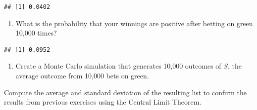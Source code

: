 \documentclass[
]{article}
\newenvironment{Shaded}{\begin{snugshade}}{\end{snugshade}}
\newcommand{\CommentTok}[1]{\textcolor[rgb]{0.56,0.35,0.01}{\textit{#1}}}
\newcommand{\DecValTok}[1]{\textcolor[rgb]{0.00,0.00,0.81}{#1}}
\newcommand{\KeywordTok}[1]{\textcolor[rgb]{0.13,0.29,0.53}{\textbf{#1}}}
\newcommand{\NormalTok}[1]{#1}
\newcommand{\OperatorTok}[1]{\textcolor[rgb]{0.81,0.36,0.00}{\textbf{#1}}}
\newcommand{\StringTok}[1]{\textcolor[rgb]{0.31,0.60,0.02}{#1}}
\providecommand{\tightlist}{%
  \setlength{\itemsep}{0pt}\setlength{\parskip}{0pt}}
\begin{document}
\begin{verbatim}
## [1] 0.0402
\end{verbatim}

\begin{enumerate}
\def\labelenumi{\arabic{enumi}.}
\setcounter{enumi}{7}
\tightlist
\item
  What is the probability that your winnings are positive after betting
  on green 10,000 times?
\end{enumerate}

\begin{Shaded}
\end{Shaded}

\begin{verbatim}
## [1] 0.0952
\end{verbatim}

\begin{enumerate}
\def\labelenumi{\arabic{enumi}.}
\setcounter{enumi}{8}
\tightlist
\item
  Create a Monte Carlo simulation that generates 10,000 outcomes of
  \(S\), the average outcome from 10,000 bets on green.
\end{enumerate}

Compute the average and standard deviation of the resulting list to
confirm the results from previous exercises using the Central Limit
Theorem.
\end{document}
